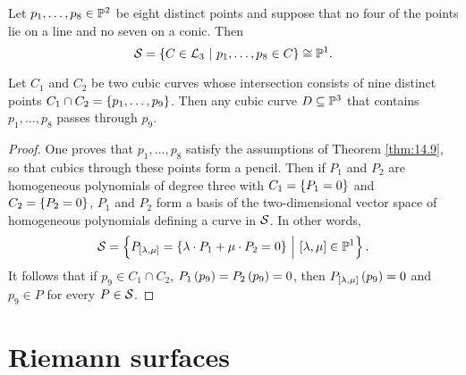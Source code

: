 \begin{proposition}
Let $ p_1, \dots, p_8 \in \mathbb{P}^2 $ be eight distinct points and suppose that no four of the points lie on a line and no seven on a conic. Then
$$ \SSS = \cbr{C \in \LLL_3 \st p_1, \dots, p_8 \in C} \cong \PP^1. $$
\end{proposition}

\begin{corollary}
Let $ C_1 $ and $ C_2 $ be two cubic curves whose intersection consists of nine distinct points $ C_1 \cap C_2 = \cbr{p_1, \dots, p_9} $. Then any cubic curve $ D \subseteq \mathbb{P}^3 $ that contains $ p_1, \dots, p_8 $ passes through $ p_9 $.
\end{corollary}

\begin{proof}
One proves that $ p_1, \dots, p_8 $ satisfy the assumptions of Theorem \ref{thm:14.9}, so that cubics through these points form a pencil. Then if $ P_1 $ and $ P_2 $ are homogeneous polynomials of degree three with $ C_1 = \cbr{P_1 = 0} $ and $ C_2 = \cbr{P_2 = 0} $, $ P_1 $ and $ P_2 $ form a basis of the two-dimensional vector space of homogeneous polynomials defining a curve in $ \mathcal{S} $. In other words,
$$ \SSS = \cbr{P_{\sbr{\lambda, \mu}} = \cbr{\lambda \cdot P_1 + \mu \cdot P_2 = 0} \st \sbr{\lambda, \mu} \in \PP^1}. $$
It follows that if $ p_9 \in C_1 \cap C_2 $, $ P_1\br{p_9} = P_2\br{p_9} = 0 $, then $ P_{\sbr{\lambda, \mu}}\br{p_9} = 0 $ and $ p_9 \in P $ for every $ P \in \mathcal{S} $.
\end{proof}

\pagebreak

\section{Riemann surfaces}

